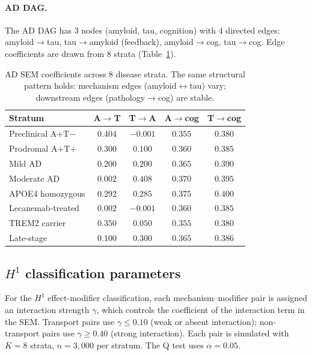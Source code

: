 \documentclass{article}
\begin{document}
\paragraph{AD DAG.}
The AD DAG has 3 nodes (amyloid, tau, cognition) with 4 directed edges: amyloid$\to$tau, tau$\to$amyloid (feedback), amyloid$\to$cog, tau$\to$cog. Edge coefficients are drawn from 8 strata (Table~\ref{tab:ad-sem}).

\begin{table}[h]
\centering
\caption{AD SEM coefficients across 8 disease strata. The same structural pattern holds: mechanism edges (amyloid$\leftrightarrow$tau) vary; downstream edges (pathology$\to$cog) are stable.}
\label{tab:ad-sem}
\small
\begin{tabular}{@{}lcccc@{}}
\toprule
\textbf{Stratum} & \textbf{A$\to$T} & \textbf{T$\to$A} & \textbf{A$\to$cog} & \textbf{T$\to$cog} \\
\midrule
Preclinical A+T$-$ & $0.404$ & $-0.001$ & $0.355$ & $0.380$ \\
Prodromal A+T+ & $0.300$ & $0.100$ & $0.360$ & $0.385$ \\
Mild AD & $0.200$ & $0.200$ & $0.365$ & $0.390$ \\
Moderate AD & $0.002$ & $0.408$ & $0.370$ & $0.395$ \\
APOE4 homozygous & $0.292$ & $0.285$ & $0.375$ & $0.400$ \\
Lecanemab-treated & $0.002$ & $-0.001$ & $0.360$ & $0.385$ \\
TREM2 carrier & $0.350$ & $0.050$ & $0.355$ & $0.380$ \\
Late-stage & $0.100$ & $0.300$ & $0.365$ & $0.386$ \\
\bottomrule
\end{tabular}
\end{table}

\subsection{$H^1$ classification parameters}

For the $H^1$ effect-modifier classification, each mechanism--modifier pair is assigned an interaction strength $\gamma$, which controls the coefficient of the interaction term in the SEM. Transport pairs use $\gamma \leq 0.10$ (weak or absent interaction); non-transport pairs use $\gamma \geq 0.40$ (strong interaction). Each pair is simulated with $K = 8$ strata, $n = 3{,}000$ per stratum. The Q test uses $\alpha = 0.05$.
\end{document}
